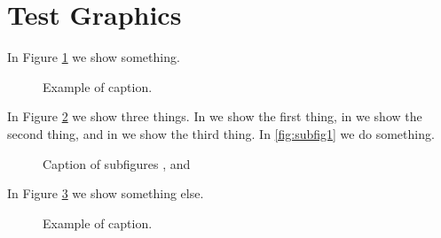 \documentclass[10pt]{article}
\begin{document}
\section{Test Graphics}

In Figure \ref{fig:SingleFigure1} we show something.
\begin{figure}[ht!]
\begin{center}
\fbox{\rule{0pt}{2in} \rule{0.9\linewidth}{0pt}}
\end{center}
   \caption{Example of caption.}
\label{fig:SingleFigure1}
\end{figure}

In Figure \ref{fig:subfigureExample} we show three things. In  we show the first thing, in  we show the second thing, and in  we show the third thing. In \ref{fig:subfig1} we do something.
\begin{figure}[ht!]
\centering
{}
\caption[Optional caption for list of figures]{Caption of subfigures ,  and }
\label{fig:subfigureExample}
\end{figure}

In Figure \ref{fig:SingleFigure2} we show something else.
\begin{figure}[ht!]
\begin{center}
\fbox{\rule{0pt}{2in} \rule{0.9\linewidth}{0pt}}
\end{center}
   \caption{Example of caption.}
\label{fig:SingleFigure2}
\end{figure}
\end{document}
